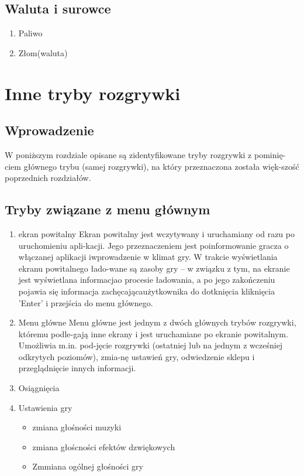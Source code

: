 \documentclass{article}
\begin{document}
    
    \subsection{Waluta i surowce}
    \begin{enumerate}
        \item Paliwo
        \item Złom(waluta)
    \end{enumerate}
    \newpage
    
\section{Inne tryby rozgrywki}
    \subsection{Wprowadzenie}
    W poniższym rozdziale opisane są zidentyfikowane tryby rozgrywki z pominię-ciem głównego trybu (samej rozgrywki), na który przeznaczona została więk-szość poprzednich rozdziałów.
    
    \subsection{Tryby związane z menu głównym}
    \begin{enumerate}
        \item ekran powitalny
        Ekran powitalny jest wczytywany i uruchamiany od razu po uruchomieniu apli-kacji. Jego przeznaczeniem jest poinformowanie gracza o włączanej aplikacji iwprowadzenie w klimat gry. W trakcie wyświetlania ekranu powitalnego łado-wane są zasoby gry – w związku z tym, na ekranie jest wyświetlana informacjao procesie ładowania, a po jego zakończeniu pojawia się informacja zachęcającaużytkownika do dotknięcia kliknięcia 'Enter' i przejścia do menu głównego.
        \item Menu główne
        Menu główne jest jednym z dwóch głównych trybów rozgrywki, któremu podle-gają inne ekrany i jest uruchamiane po ekranie powitalnym. Umożliwia m.in. pod-jęcie rozgrywki (ostatniej lub na jednym z wcześniej odkrytych poziomów), zmia-nę  ustawień  gry,  odwiedzenie  sklepu  i  przeglądnięcie  innych  informacji. 
        \item Osiągnięcia
        \item Ustawienia gry
        \begin{itemize}
            \item zmiana głośności muzyki
            \item zmiana głoścności efektów dzwiękowych
            \item Zmmiana ogólnej głośności gry
        \end{itemize}
        
    \end{enumerate}
    
\end{document}
